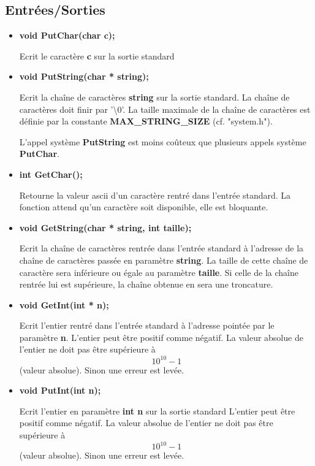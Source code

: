 \documentclass{article}
\begin{document}
\subsection{Entrées/Sorties}
\begin{itemize}
    \item 
    \textbf{void PutChar(char c);}
    
    Ecrit le caractère \textbf{c}  sur la sortie standard
    
    \item 
    \textbf{void PutString(char * string);}
    
    Ecrit la chaîne de caractères \textbf{string} sur la sortie standard.
    La chaîne de caractères doit finir par '\textbackslash0'.
    La taille maximale de la chaîne de caractères est définie par la constante \textbf{MAX\_STRING\_SIZE} (cf. "system.h").
    
    L'appel système \textbf{PutString} est moins coûteux que plusieurs appels système \textbf{PutChar}.
    
     \item 
    \textbf{int GetChar();}
    
    Retourne la valeur ascii d'un caractère rentré dans l'entrée standard.
    La fonction attend qu'un caractère soit disponible, elle est bloquante.
    
    
     \item 
    \textbf{void GetString(char * string, int taille);}
    
    Ecrit la chaîne de caractères rentrée dans l'entrée standard à l'adresse de la chaîne de caractères passée en paramètre \textbf{string}. La taille de cette chaîne de caractère sera inférieure ou égale au paramètre \textbf{taille}. Si celle de la chaîne rentrée lui est supérieure, la chaîne obtenue en sera une troncature.
    
      \item 
    \textbf{void GetInt(int * n);}
    
    Ecrit l'entier rentré dans l'entrée standard à l'adresse pointée par le paramètre \textbf{n}.
    L'entier peut être positif comme négatif.
    La valeur absolue de l'entier ne doit pas être supérieure à \[10^{10}-1\] (valeur absolue). Sinon une erreur est levée.
    
    
    
      \item 
    \textbf{void PutInt(int n);}
    
     Ecrit l'entier en paramètre \textbf{int n} sur la sortie standard
    L'entier peut être positif comme négatif.
    La valeur absolue de l'entier ne doit pas être supérieure à \[10^{10}-1\] (valeur absolue). Sinon une erreur est levée.
    
    
\end{itemize}
\end{document}
